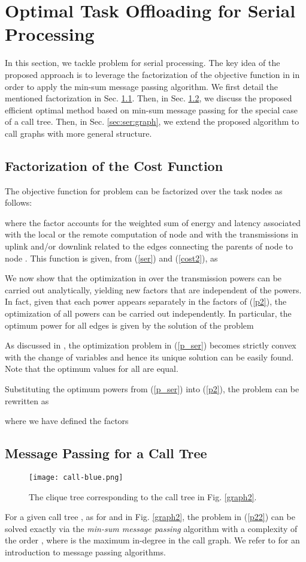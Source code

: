 \documentclass[journal,twocolumn,10pt,twoside]{IEEEtranTCOM}
\theoremstyle{plain}
\theoremstyle{plain}
\theoremstyle{remark}
\begin{document}
\section{Optimal Task Offloading for Serial Processing}
\label{sec:ser}
In this section, we tackle problem  for serial processing. The key idea of the proposed approach is to leverage the factorization of the objective function in  in order to apply the min-sum message passing algorithm. We first detail the mentioned factorization in Sec. \ref{sec:ser:gen}. Then, in Sec. \ref{sec:ser:tree}, we discuss the proposed efficient optimal method based on min-sum message passing \cite{koller} for the special case of a call tree. Then, in Sec. \ref{sec:ser:graph}, we extend the proposed algorithm to call graphs with more general structure.
\subsection{Factorization of the Cost Function}
\label{sec:ser:gen}
The objective function for problem  can be factorized over the task nodes as follows:

where the factor  accounts for the weighted sum of energy and latency associated with the local or the remote computation of node  and with the transmissions in uplink and/or downlink related to the edges connecting the parents of node  to node . This function is given, from (\ref{ser}) and (\ref{cost2}), as





We now show that the optimization in  over the transmission powers  can be carried out analytically, yielding new factors that are independent of the powers. In fact, given that each power  appears separately in the factors of (\ref{p2}), the optimization of all powers can be carried out independently. In particular, the optimum power  for all edges  is given by the solution of the problem


As discussed in \cite{bar}, the optimization problem in (\ref{p_ser}) becomes strictly convex with the change of variables  and hence its unique solution can be easily found. Note that the optimum values  for all  are equal.

Substituting the optimum powers from (\ref{p_ser}) into (\ref{p2}), the problem  can be rewritten as

where we have defined the factors

\subsection{Message Passing for a Call Tree}
\label{sec:ser:tree}
 \begin{figure}
\centering
\texttt{[image: call-blue.png]}
\caption{The clique tree  corresponding to the call tree  in Fig. \ref{graph2}.}\label{cluster}
\end{figure}
For a given call tree , as for  and  in Fig. \ref{graph2}, the problem  in (\ref{p22}) can be solved exactly via the \textit{min-sum message passing} algorithm with a complexity of the order , where  is the maximum in-degree in the call graph. We refer to \cite{koller} for an introduction to message passing algorithms.
\end{document}
